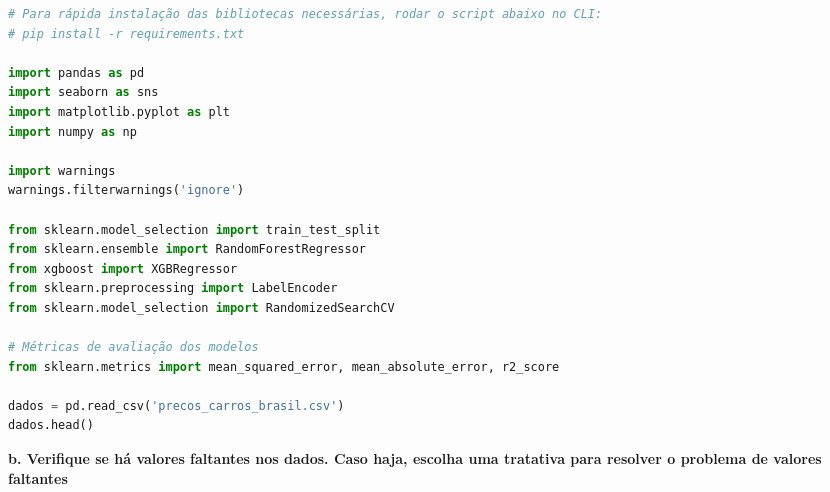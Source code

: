 \begin{lstlisting}[language=Python, style=input]
# Para rápida instalação das bibliotecas necessárias, rodar o script abaixo no CLI:
# pip install -r requirements.txt

import pandas as pd
import seaborn as sns
import matplotlib.pyplot as plt
import numpy as np

import warnings
warnings.filterwarnings('ignore')

from sklearn.model_selection import train_test_split
from sklearn.ensemble import RandomForestRegressor
from xgboost import XGBRegressor
from sklearn.preprocessing import LabelEncoder
from sklearn.model_selection import RandomizedSearchCV

# Métricas de avaliação dos modelos
from sklearn.metrics import mean_squared_error, mean_absolute_error, r2_score

dados = pd.read_csv('precos_carros_brasil.csv')
dados.head()
\end{lstlisting}

\begin{table}[H]
\centering
{}
\end{table}

\begin{adjustwidth}{1em}{}
\textbf{b. Verifique se há valores faltantes nos dados. Caso haja, escolha uma tratativa para resolver o problema de valores faltantes}
\end{adjustwidth}

